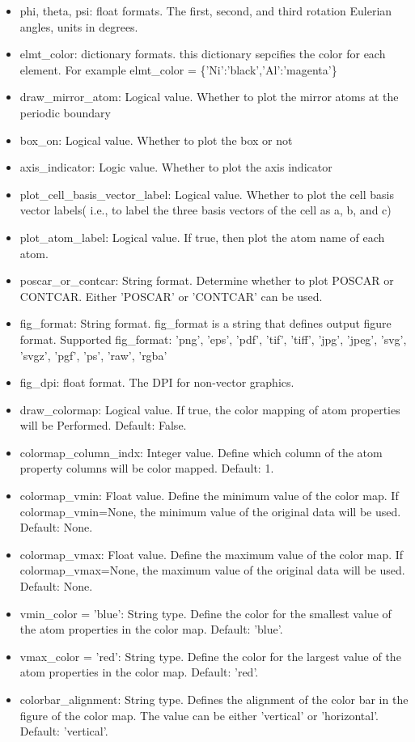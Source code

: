 \documentclass[12pt]{book}
\begin{document}
\begin{itemize}
\item phi, theta, psi: float formats. The first, second, and third rotation Eulerian angles, units in degrees.
\item elmt\_color: dictionary formats. this dictionary sepcifies the color for each element. For example elmt\_color = \{'Ni':'black','Al':'magenta'\}
\item draw\_mirror\_atom: Logical value. Whether to plot the mirror atoms at the periodic boundary
\item box\_on: Logical value. Whether to plot the box or not
\item axis\_indicator: Logic value. Whether to plot the axis indicator
\item plot\_cell\_basis\_vector\_label: Logical value. Whether to plot the cell basis vector labels( i.e., to label the three basis vectors of the cell as a, b, and c)
\item plot\_atom\_label: Logical value. If true, then plot the atom name of each atom.
\item poscar\_or\_contcar: String format. Determine whether to plot POSCAR or CONTCAR. Either 'POSCAR' or 'CONTCAR' can be used. 
\item fig\_format: String format. fig\_format is a string that defines output figure format. Supported fig\_format: 'png', 'eps', 'pdf', 'tif', 'tiff', 'jpg', 'jpeg', 'svg', 'svgz', 'pgf', 'ps', 'raw', 'rgba'
\item fig\_dpi: float format. The DPI for non-vector graphics.
\item draw\_colormap: Logical value. If true, the color mapping of atom properties will be Performed. Default: False.
\item colormap\_column\_indx: Integer value. Define which column of the atom property columns will be color mapped. Default: 1.
\item colormap\_vmin: Float value. Define the minimum value of the color map. If colormap\_vmin=None, the minimum value of the original data will be used. Default: None.
\item colormap\_vmax: Float value. Define the maximum value of the color map. If colormap\_vmax=None, the maximum value of the original data will be used. Default: None.
\item vmin\_color = 'blue': String type. Define the color for the smallest value of the atom properties in the color map. Default: 'blue'.
\item vmax\_color = 'red': String type. Define the color for the largest value of the atom properties in the color map. Default: 'red'.
\item colorbar\_alignment: String type. Defines the alignment of the color bar in the figure of the color map. The value can be either 'vertical' or 'horizontal'. Default: 'vertical'.
\end{itemize}
\end{document}
